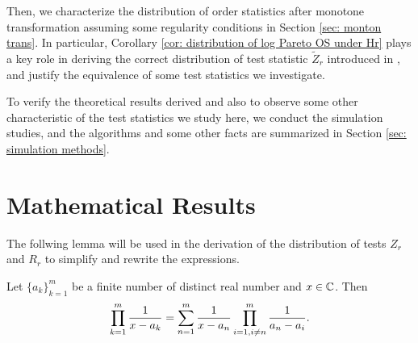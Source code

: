 \documentclass{report}
\begin{document}
Then, we characterize the distribution of order statistics after
monotone transformation assuming some regularity conditions in Section \ref{sec: monton trans}. In particular, Corollary \ref{cor: distribution of log Pareto OS under Hr}
plays a key role in deriving the correct distribution of test statistic $\tilde Z_r$ introduced in \cite{jabbari2019detecting}, and justify
the equivalence of some test statistics we investigate.

To verify the theoretical results derived and also to observe some other characteristic of the test statistics we study here,
we conduct the simulation studies, and the algorithms and some other facts are summarized in Section \ref{sec: simulation methods}.


\section{Mathematical Results} \label{sec: mathematical result}

The follwing lemma will be used in the derivation of the distribution of tests $Z_r$ and $R_r$ to simplify and rewrite the expressions.

 \begin{lem}\label{Lemma: partial fraction}
     Let $\{a_k\}_{k=1}^m$ be a finite number of distinct real number and $x \in \CC$. Then
     \[ 
         \prodk[1]{m} \frac{1}{x - a_k} = \sumn[1]{m} \frac{1}{x-a_n} \prod_{\substack{i = 1, i\neq n}}^{m} \frac{1}{a_n -a_i}.
     \]
 \end{lem}
 
\end{document}
